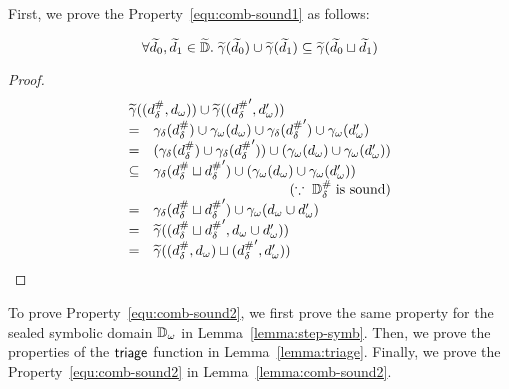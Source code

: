 First, we prove the Property~\ref{equ:comb-sound1} as follows:
\begin{lemma}
  \[
    \forall \widetilde{d}_0, \widetilde{d}_1 \in \widetilde{\mathbb{D}}. \; \widetilde{\gamma}(\widetilde{d}_0) \cup
    \widetilde{\gamma}(\widetilde{d}_1) \subseteq \widetilde{\gamma}(\widetilde{d}_0 \sqcup \widetilde{d}_1)
  \]
\end{lemma}
\begin{proof}
  \[
    \begin{array}{cl}
      \multicolumn{2}{l}{
        \combgamma((\sabselem, \symbelem)) \cup \combgamma((\sabselem', \symbelem'))
      }\\
      =& \sgamma(\sabselem) \cup \symbgamma(\symbelem)
      \cup \sgamma(\sabselem') \cup \symbgamma(\symbelem')\\
      =& (\sgamma(\sabselem)\cup \sgamma(\sabselem'))
      \cup (\symbgamma(\symbelem) \cup \symbgamma(\symbelem'))\\
      \subseteq& \sgamma(\sabselem \join \sabselem')
      \cup (\symbgamma(\symbelem) \cup \symbgamma(\symbelem'))\\
      & \multicolumn{1}{r}{(\because \; \sabsdom \; \text{is sound})}\\
      =& \sgamma(\sabselem \join \sabselem')
      \cup \symbgamma(\symbelem \cup \symbelem')\\
      =& \combgamma((\sabselem \join \sabselem', \symbelem \cup \symbelem'))\\
      =& \combgamma((\sabselem, \symbelem) \join (\sabselem', \symbelem'))\\
    \end{array}
  \]
\end{proof}

To prove Property~\ref{equ:comb-sound2}, we first prove the same property for
the sealed symbolic domain ${\mathbb{D}}_\omega$ in Lemma~\ref{lemma:step-symb}.  Then, we
prove the properties of the $\textsf{triage}$ function in Lemma~\ref{lemma:triage}.
Finally, we prove the Property~\ref{equ:comb-sound2} in
Lemma~\ref{lemma:comb-sound2}.

